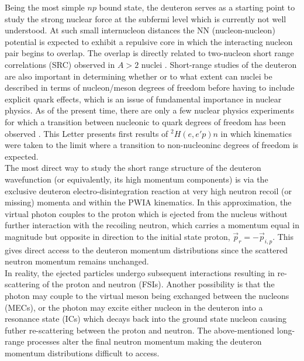 Being the most simple $np$ bound state, the deuteron serves as a starting point to study the strong nuclear force at the subfermi level which is currently
not well understood. At such small internucleon distances the NN (nucleon-nucleon) potential is expected to exhibit a repulsive core in which the interacting
nucleon pair begins to overlap. The overlap is directly related to two-nucleon short range correlations (SRC) observed in $A>2$ nuclei \cite{PhysRevC.68.014313,PhysRevLett.96.082501,PhysRevLett.99.072501,Fomin_2017}.
Short-range studies of the deuteron are also important in determining whether or to what extent can nuclei be described in terms of nucleon/meson degrees of freedom before
having to include explicit quark effects, which is an issue of fundamental importance in nuclear physics\cite{pr01-020}. As of the present time, there are only a few nuclear physics experiments for
which a transition between nucleonic to quark degrees of freedom has been observed \cite{PhysRevLett.81.4576,PhysRevLett.87.102302,PhysRevC.66.042201}.
This Letter presents first results of $^{2}H(e,e'p)n$ in which kinematics were taken to the limit where a transition to non-nucleoninc degrees of freedom is expected.\\
\indent The most direct way to study the short range structure of the deuteron wavefunction (or equivalently, its high momentum components) is via the exclusive deuteron
electro-disintegration reaction at very high neutron recoil (or missing) momenta and within the PWIA kinematics. In this approximation, the virtual photon couples to
the proton which is ejected from the nucleus without further interaction with the recoiling neutron, which carries a momentum equal in magnitude but opposite in direction
to the initial state proton, $\vec{p}_{r} = -\vec{p}_{i,p}$. This gives direct access to the deuteron momentum distributions since the scattered neutron momentum remains unchanged. \\
\indent In reality, the ejected particles undergo subsequent interactions resulting in re-scattering of the proton and neutron (FSIs). Another possibility is that the
photon may couple to the virtual meson being exchanged between the nucleons (MECs), or the photon may excite either nucleon in the deuteron into a resonance state (ICs) which
decays back into the ground state nucleon causing futher re-scattering between the proton and neutron. The above-mentioned long-range processes alter the final neutron
momentum making the deuteron momentum distributions difficult to access.\\
